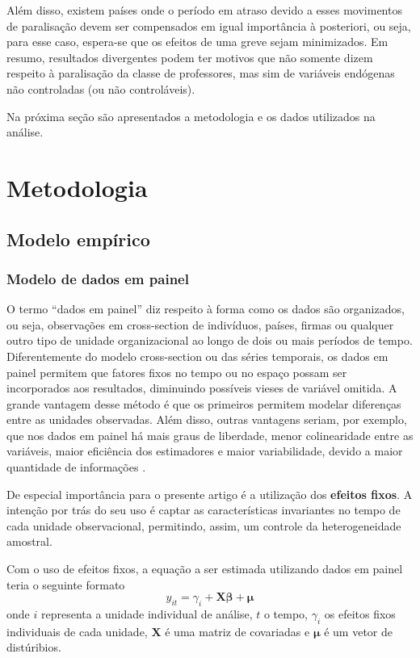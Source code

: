 Além disso, existem países onde o período em atraso devido a esses movimentos de paralisação devem ser compensados em igual importância à posteriori, ou seja, para esse caso, espera-se que os efeitos de uma greve sejam minimizados. Em resumo, resultados divergentes podem ter motivos que não somente dizem respeito à paralisação da classe de professores, mas sim de variáveis endógenas não controladas (ou não controláveis).

Na próxima seção são apresentados a metodologia e os dados utilizados na análise.

\chapter{Metodologia}

\section{Modelo empírico}

\subsection{Modelo de dados em painel}

O termo “dados em painel” diz respeito à forma como os dados são organizados, ou seja, observações em cross-section de indivíduos, países, firmas ou qualquer outro tipo de unidade organizacional ao longo de dois ou mais períodos de tempo. Diferentemente do modelo cross-section ou das séries temporais, os dados em painel permitem que fatores fixos no tempo ou no espaço possam ser incorporados aos resultados, diminuindo possíveis vieses de variável omitida. A grande vantagem desse método é que os primeiros permitem modelar diferenças entre as unidades observadas. Além disso, outras vantagens seriam, por exemplo, que nos dados em painel há mais graus de liberdade, menor colinearidade entre as variáveis, maior eficiência dos estimadores e maior variabilidade, devido a maior quantidade de informações \cite{Baltagi2005}.

De especial importância para o presente artigo é a utilização dos \textbf{efeitos fixos}. A intenção por trás do seu uso é captar as características invariantes no tempo de cada unidade observacional, permitindo, assim, um controle da heterogeneidade amostral.

Com o uso de efeitos fixos, a equação a ser estimada utilizando dados em painel teria o seguinte formato 
\begin{equation} \label{eq:painel} \tag{3.1.1}
y_{it} = \gamma_i + \bm{X\beta} + \bm{\mu}
\end{equation}
onde $i$ representa a unidade individual de análise, $t$ o tempo, $\gamma_i$ os efeitos fixos individuais de cada unidade, $\bm{X}$ é uma matriz de covariadas e $\bm{\mu}$ é um vetor de distúribios.

